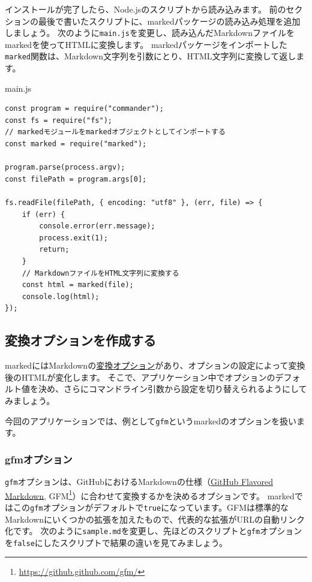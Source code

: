 インストールが完了したら、Node.jsのスクリプトから読み込みます。
前のセクションの最後で書いたスクリプトに、markedパッケージの読み込み処理を追加しましょう。
次のように\texttt{main.js}を変更し、読み込んだMarkdownファイルをmarkedを使ってHTMLに変換します。
markedパッケージをインポートした\texttt{marked}関数は、Markdown文字列を引数にとり、HTML文字列に変換して返します。

\begin{listtitle}
main.js
\end{listtitle}
\begin{lstlisting}
const program = require("commander");
const fs = require("fs");
// markedモジュールをmarkedオブジェクトとしてインポートする
const marked = require("marked");

program.parse(process.argv);
const filePath = program.args[0];

fs.readFile(filePath, { encoding: "utf8" }, (err, file) => {
    if (err) {
        console.error(err.message);
        process.exit(1);
        return;
    }
    // MarkdownファイルをHTML文字列に変換する
    const html = marked(file);
    console.log(html);
});
\end{lstlisting}
\listend

\hypertarget{create-convert-option}{%
\subsection{変換オプションを作成する}\label{create-convert-option}}

markedにはMarkdownの\href{https://marked.js.org/\#/USING_ADVANCED.md\#options}{変換オプション}があり、オプションの設定によって変換後のHTMLが変化します。
そこで、アプリケーション中でオプションのデフォルト値を決め、さらにコマンドライン引数から設定を切り替えられるようにしてみましょう。

今回のアプリケーションでは、例として\texttt{gfm}というmarkedのオプションを扱います。

\hypertarget{gfm-option}{%
\subsubsection{gfmオプション}\label{gfm-option}}

\texttt{gfm}オプションは、GitHubにおけるMarkdownの仕様（\href{https://github.github.com/gfm/}{GitHub
Flavored Markdown}, GFM\footnote{\url{https://github.github.com/gfm/}}）に合わせて変換するかを決めるオプションです。
markedではこの\texttt{gfm}オプションがデフォルトで\texttt{true}になっています。GFMは標準的なMarkdownにいくつかの拡張を加えたもので、代表的な拡張がURLの自動リンク化です。
次のように\texttt{sample.md}を変更し、先ほどのスクリプトと\texttt{gfm}オプションを\texttt{false}にしたスクリプトで結果の違いを見てみましょう。

